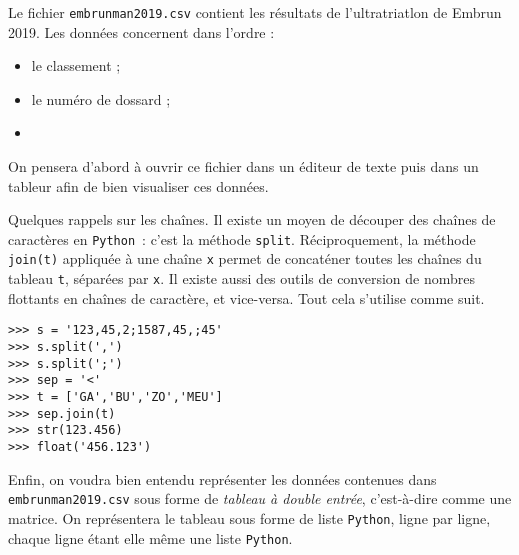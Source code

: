 \exer{[FIC-012]}
\setcounter{numques}{0}


Le fichier \texttt{embrunman2019.csv} contient les résultats de l'ultratriatlon de Embrun 2019. Les données concernent dans l'ordre :
\begin{itemize}
  \item le classement  ;
  \item le numéro de dossard ;
  \item
\end{itemize}

On pensera d'abord à ouvrir ce fichier dans un éditeur de texte puis dans un tableur afin de bien visualiser ces données. 



Quelques rappels sur les chaînes. Il existe un moyen de \og découper \fg{} des chaînes de caractères en \texttt{Python}\ : c'est la méthode \texttt{split}. 
Réciproquement, la méthode \texttt{join(t)} appliquée à une chaîne \texttt{x} permet de concaténer toutes les chaînes du tableau \texttt{t}, séparées par \texttt{x}.
Il existe aussi des outils de conversion de nombres flottants en chaînes de caractère, et vice-versa.
Tout cela s'utilise comme suit.

\begin{lstlisting}
>>> s = '123,45,2;1587,45,;45'
>>> s.split(',')
>>> s.split(';')
>>> sep = '<'
>>> t = ['GA','BU','ZO','MEU']
>>> sep.join(t)
>>> str(123.456)
>>> float('456.123')
\end{lstlisting}

Enfin, on voudra bien entendu représenter les données contenues dans \texttt{embrunman2019.csv} sous forme de \emph{tableau à double entrée}, c'est-à-dire comme une matrice. On représentera le tableau sous forme de liste \texttt{Python}, ligne par ligne, chaque ligne étant elle même une liste \texttt{Python}.
